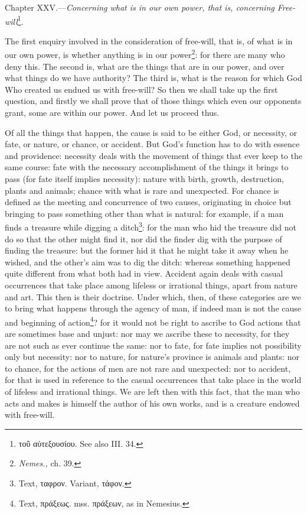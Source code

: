 
Chapter XXV.—\emph{Concerning what is in our own power, that is, concerning Free-will}\footnote{\textgreek{τοῦ αὐτεξουσίου}. See also III. 34.}.

The first enquiry involved in the consideration of free-will, that is, of what is in our own power, is whether anything is in our power\footnote{\emph{Nemes.,} ch. 39.}: for there are many who deny this. The second is, what are the things that are in our power, and over what things do we have authority? The third is, what is the reason for which God Who created us endued us with free-will? So then we shall take up the first question, and firstly we shall prove that of those things which even our opponents grant, some are within our power. And let us proceed thus.

Of all the things that happen, the cause is said to be either God, or necessity, or fate, or nature, or chance, or accident. But God’s function has to do with essence and providence: necessity deals with the movement of things that ever keep to the same course: fate with the necessary accomplishment of the things it brings to pass (for fate itself implies necessity): nature with birth, growth, destruction, plants and animals; chance with what is rare and unexpected. For chance is defined as the meeting and concurrence of two causes, originating in choice but bringing to pass something other than what is natural: for example, if a man finds a treasure while digging a ditch\footnote{Text, \textgreek{ταφρον}. Variant, \textgreek{τάφον}.}: for the man who hid the treasure did not do so that the other might find it, nor did the finder dig with the purpose of finding the treasure: but the former hid it that he might take it away when he wished, and the other’s aim was to dig the ditch: whereas something happened quite different from what both had in view. Accident again deals with casual occurrences that take place among lifeless or irrational things, apart from nature and art. This then is their doctrine. Under which, then, of these categories are we to bring what happens through the agency of man, if indeed man is not the cause and beginning of action\footnote{Text, \textgreek{πράξεως}. mss. \textgreek{πράξεων}, as in Nemesius.}? for it would not be right to ascribe to God actions that are sometimes base and unjust: nor may we ascribe these to necessity, for they are not such as ever continue the same: nor to fate, for fate implies not possibility only but necessity: nor to nature, for nature’s province is animals and plants: nor to chance, for the actions of men are not rare and unexpected: nor to accident, for that is used in reference to the casual occurrences that take place in the world of lifeless and irrational things. We are left then with this fact, that the man who acts and makes is himself the author of his own works, and is a creature endowed with free-will.


